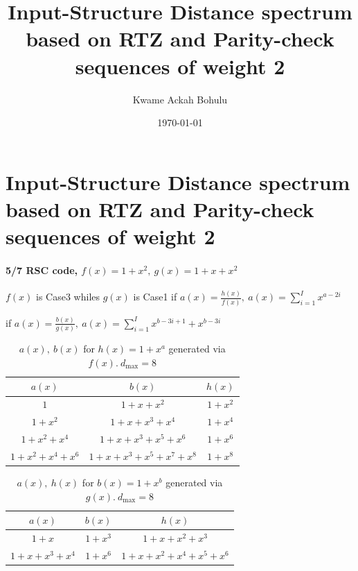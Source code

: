 \documentclass[11pt, oneside, dvipdfmx]{book}
\title{
Input-Structure Distance spectrum based on RTZ and Parity-check sequences of weight 2}
\author{Kwame Ackah Bohulu}
\date{\today}
\begin{document}
\maketitle

\newpage
\section{Input-Structure Distance spectrum based on RTZ and Parity-check sequences of weight 2}

\paragraph{5/7 RSC code, $f(x)=1+x^2,~g(x)=1+x+x^2$ \newline}
$f(x)$ is Case3 whiles $g(x)$ is Case1
if $a(x)=\frac{h(x)}{f(x)},~a(x)=\sum_{i=1}^{I}x^{a-2i}$

if $a(x)=\frac{b(x)}{g(x)},~a(x)=\sum_{i=1}^{I}x^{b-3i+1}+x^{b-3i}$
 \begin{table}[h!]
 \caption{$a(x),~b(x)$ for $h(x)=1+x^a$ generated via $f(x).~d_{\text{max}}=8$}
\centering
 \begin{tabular}{c c c} 
 \hline
 $a(x)$ & $b(x)$ & $h(x)$ \\ [0.5ex] 
 \hline\hline
$1$ & $1+x+x^{2}$ & $1+x^2$\\
\hline
$1+x^2$ & $1+x+x^3+x^4$ & $1+x^{4}$\\
\hline
$1+x^2+x^4$ & $1+x+x^3+x^5+x^6$ &  $1+x^{6}$\\
\hline
$1+x^2+x^4+x^6$ & $1+x+x^3+x^5+x^7+x^8$ &  $1+x^{8}$\\
 \end{tabular}
 \label{Tab1}
\end{table}

 \begin{table}[h!]
 \caption{$a(x),~h(x)$ for $b(x)=1+x^b$ generated via $g(x).~d_{\text{max}}=8$}
\centering
 \begin{tabular}{c c c} 
 \hline
 $a(x)$ & $b(x)$ & $h(x)$ \\ [0.5ex] 
 \hline\hline
$1+x$ & $1+x^{3}$ & $1+x+x^2+x^3$\\
\hline
$1+x+x^3+x^4$ & $1+x^6$ & $1+x+x^{2}+x^4+x^5+x^6$\\
 \end{tabular}
 \label{Tab2}
\end{table}
\end{document}
